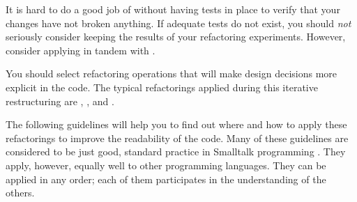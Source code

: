 \documentclass[a4paper,10pt,twoside]{book}
\begin{document}
It is hard to do a good job of  without having tests in place to verify that your changes have not broken anything. If adequate tests do not exist, you should \emph{not} seriously consider keeping the results of your refactoring experiments. However, consider applying  in tandem with . 

You should select refactoring operations that will make design decisions more explicit in the code. The typical refactorings applied during this iterative restructuring are , , and .

The following guidelines will help you to find out where and how to apply these refactorings to improve the readability of the code. Many of these guidelines are considered to be just good, standard practice in Smalltalk programming \cite{Beck97a}. They apply, however, equally well to other programming languages. They can be applied in any order; each of them participates in the understanding of the others.
\end{document}
